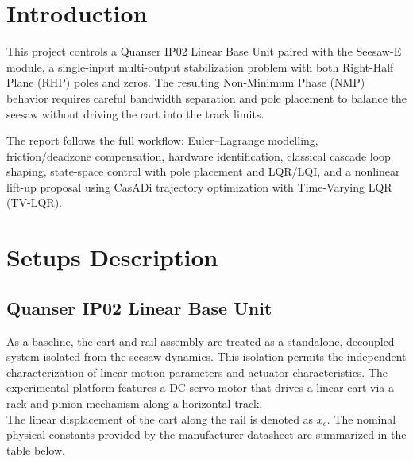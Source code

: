 \documentclass[11pt,a4paper]{article}
\begin{document}


\section{Introduction}\label{sec:intro}
This project controls a Quanser IP02 Linear Base Unit paired with the Seesaw-E module, a single-input multi-output stabilization problem with both Right-Half Plane (RHP) poles and zeros. The resulting Non-Minimum Phase (NMP) behavior requires careful bandwidth separation and pole placement to balance the seesaw without driving the cart into the track limits.

The report follows the full workflow: Euler--Lagrange modelling, friction/deadzone compensation, hardware identification, classical cascade loop shaping, state-space control with pole placement and LQR/LQI, and a nonlinear lift-up proposal using CasADi trajectory optimization with Time-Varying LQR (TV-LQR).


\section{Setups Description} \label{sec:setups}

\subsection{Quanser IP02 Linear Base Unit}\label{sub:cart_setup}
As a baseline, the cart and rail assembly are treated as a standalone, decoupled system isolated from the seesaw dynamics. This isolation permits the independent characterization of linear motion parameters and actuator characteristics. The experimental platform features a DC servo motor that drives a linear cart via a rack-and-pinion mechanism along a horizontal track.\\
The linear displacement of the cart along the rail is denoted as $x_c$. The nominal physical constants provided by the manufacturer datasheet are summarized in the table below.
\end{document}
